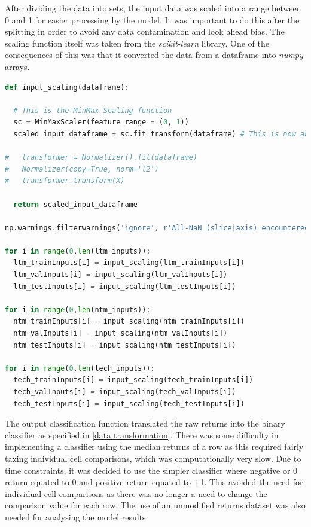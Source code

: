 \documentclass[10pt,onecolumn,letterpaper]{article}
\begin{document}
After dividing the data into sets, the input data was scaled into a range between 0 and 1 for easier processing by the model. It was important to do this after the splitting in order to avoid any data contamination and look ahead bias. The scaling function itself was taken from the \textit{scikit-learn} library. One of the consequences of this was that it converted the data from a dataframe into \textit{numpy} arrays. 

\begin{lstlisting}[language=Python, breaklines=true, caption={Functionality to scale the input attributes between 0 and 1.}]
def input_scaling(dataframe):
  
  # This is the MinMax Scaling function 
  sc = MinMaxScaler(feature_range = (0, 1))
  scaled_input_dataframe = sc.fit_transform(dataframe) # This is now an n-dimensional array type
  
#   transformer = Normalizer().fit(dataframe)
#   Normalizer(copy=True, norm='l2')
#   transformer.transform(X)
  
  return scaled_input_dataframe

np.warnings.filterwarnings('ignore', r'All-NaN (slice|axis) encountered')

for i in range(0,len(ltm_inputs)):
  ltm_trainInputs[i] = input_scaling(ltm_trainInputs[i])
  ltm_valInputs[i] = input_scaling(ltm_valInputs[i])
  ltm_testInputs[i] = input_scaling(ltm_testInputs[i])
  
for i in range(0,len(ntm_inputs)):
  ntm_trainInputs[i] = input_scaling(ntm_trainInputs[i])
  ntm_valInputs[i] = input_scaling(ntm_valInputs[i])
  ntm_testInputs[i] = input_scaling(ntm_testInputs[i])

for i in range(0,len(tech_inputs)):
  tech_trainInputs[i] = input_scaling(tech_trainInputs[i])
  tech_valInputs[i] = input_scaling(tech_valInputs[i])
  tech_testInputs[i] = input_scaling(tech_testInputs[i])
\end{lstlisting} 

The output classification function translated the raw returns into the binary classifier as specified in \ref{data transformation}. There was some difficulty in implementing a classifier using the median returns of a row as this required fairly taxing individual cell comparisons, which was computationally very slow. Due to time constraints, it was decided to use the simpler classifier where negative or 0 return equated to 0 and positive return equated to +1. This avoided the need for individual cell comparisons as there was no longer a need to change the comparison value for each row. The use of an unmodified returns dataset was also needed for analysing the model results.
\end{document}
